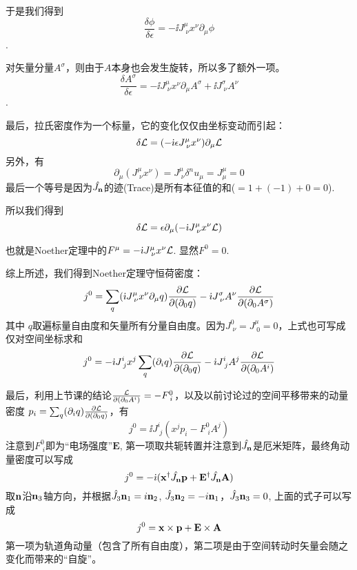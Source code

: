 \documentclass[CJK]{beamer}
\begin{document}
\begin{frame}
\bch
于是我们得到
$$\frac{\delta \phi}{\delta\epsilon} = -\ii  J^\mu_{\;\nu} x^\nu \partial_\mu \phi$$.

\skipline
对矢量分量$A^\sigma$，则由于$A$本身也会发生旋转，所以多了额外一项。
$$\frac{\delta A^\sigma}{\delta\epsilon} = -\ii  J^\mu_{\;\nu} x^\nu\partial_\mu A^\sigma + \ii J^\sigma_{\;\nu}A^\nu$$.

\ech
\end{frame}

\begin{frame}
\bch
最后，拉氏密度作为一个标量，它的变化仅仅由坐标变动而引起：
$$ \delta {\mathcal{L}} = (-{\dot{\imath}} \epsilon J^\mu_{\;\nu} x^\nu)\partial_\mu {\mathcal{L}} $$
另外，有
$$\partial_\mu(J^\mu_{\;\nu} x^\nu) = J^\mu_{\;\nu} \delta^nu_\mu = J^\mu_\mu = 0 $$
最后一个等号是因为${\hat{J_{\mathbf{n}}}}$的迹(Trace)是所有本征值的和($=1+(-1)+0 = 0$).

所以我们得到
$$\delta {\mathcal{L}} = \epsilon \partial_\mu (-{\dot{\imath}}  J^\mu_{\;\nu} x^\nu {\mathcal{L}}) $$

也就是Noether定理中的$F^\mu = -{\dot{\imath}}  J^\mu_{\;\nu} x^\nu {\mathcal{L}}$. 显然$F^0 = 0$.
\ech
\end{frame}

\begin{frame}
\bch
综上所述，我们得到Noether定理守恒荷密度：
$$j^0 =   \sum_q({\dot{\imath}}  J^\mu_{\;\nu} x^\nu \partial_\mu q) \frac{\partial {\mathcal{L}}}{\partial(\partial_0 q)} - {\dot{\imath}} J^\sigma_{\;\nu}A^\nu \frac{\partial {\mathcal{L}}}{\partial(\partial_0 A^\sigma)}$$
其中 $q$取遍标量自由度和矢量所有分量自由度。因为$J^0_{\;\nu} = J^\mu_{\;0} = 0$，上式也可写成仅对空间坐标求和
$$j^0 =  -{\dot{\imath}}  J^i_{\;j} x^j \sum_q(\partial_i q )\frac{\partial {\mathcal{L}}}{\partial(\partial_0 q)} - {\dot{\imath}} J^i_{\;j}A^j \frac{\partial {\mathcal{L}}}{\partial(\partial_0 A^i)}$$
\ech
\end{frame}

\begin{frame}
\bch
最后，利用上节课的结论$\frac{{\mathcal{L}}}{\partial(\partial_0 A^i)} = - F^0_{\; i}$，以及以前讨论过的空间平移带来的动量密度
$p_i = \sum_q(\partial_i q )\frac{\partial {\mathcal{L}}}{\partial(\partial_0 q)} $，有
$$j^0 =  \ii  J^i_{\;j} (x^j p_i - F^0_{\;i} A^j)$$
注意到$F^0_{\;i}$即为“电场强度”$\mathbf{E}$, 第一项取共轭转置并注意到${\hat{J_{\mathbf{n}}}}$是厄米矩阵，最终角动量密度可以写成 
$$j^0=-{\dot{\imath}}({\mathbf{x}}^\dagger {\hat{J_{\mathbf{n}}}} {\mathbf{p}} + \mathbf{E}^\dagger {\hat{J_{\mathbf{n}}}} \mathbf{A})$$
取${\mathbf{n}}$沿${\mathbf{n}}_3$轴方向，并根据$\hat{J_{ 3 }}{\mathbf{n}}_1 = i {\mathbf{n}}_2$, $\hat{J_{ 3 }}{\mathbf{n}}_2 = - i{\mathbf{n}}_1$，$\hat{J_{ 3 }}{\mathbf{n}}_3 = 0$, 上面的式子可以写成
$$j^0 = {\mathbf{x}} \times {\mathbf{p}} + \mathbf{E} \times \mathbf{A}$$
第一项为轨道角动量（包含了所有自由度），第二项是由于空间转动时矢量会随之变化而带来的“自旋”。

\ech
\end{frame}

\begin{frame}
\chtitle{}
\end{frame}
\end{document}
